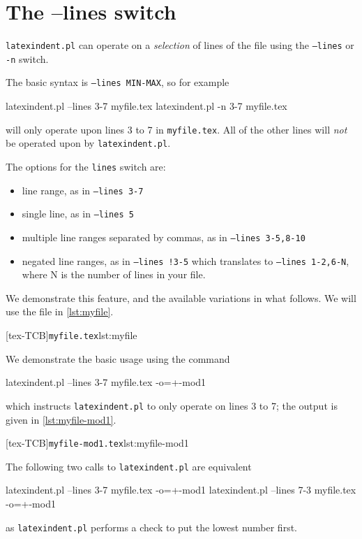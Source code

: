 \documentclass[10pt]{article}
\begin{document}
\section{The --lines switch}\label{sec:line-switch}
 \texttt{latexindent.pl}
  can
 operate on a \emph{selection} of lines of the file using the \texttt{--lines} or
 \texttt{-n} switch.


 The basic syntax is \texttt{--lines MIN-MAX}, so for example

 \begin{commandshell}
latexindent.pl --lines 3-7 myfile.tex
latexindent.pl -n 3-7 myfile.tex
\end{commandshell}

 will only operate upon lines 3 to 7 in \texttt{myfile.tex}. All of the other lines will
 \emph{not} be operated upon by \texttt{latexindent.pl}.

 The options for the \texttt{lines} switch are:
 \begin{itemize}
  \item line range, as in \texttt{--lines 3-7}
  \item single line, as in \texttt{--lines 5}
  \item multiple line ranges separated by commas, as in \texttt{--lines 3-5,8-10}
  \item negated line ranges, as in \texttt{--lines !3-5} which translates to
        \texttt{--lines 1-2,6-N}, where N is the number of lines in your file.
 \end{itemize}

 We demonstrate this feature, and the available variations in what follows. We will use
 the file in \cref{lst:myfile}.

 [tex-TCB]{\texttt{myfile.tex}}{lst:myfile}

 \begin{example}
 We demonstrate the basic usage using the command

 \begin{commandshell}
latexindent.pl --lines 3-7 myfile.tex -o=+-mod1
\end{commandshell}

 which instructs \texttt{latexindent.pl} to only operate on lines 3 to 7; the output is
 given in \cref{lst:myfile-mod1}.

 [tex-TCB]{\texttt{myfile-mod1.tex}}{lst:myfile-mod1}

 The following two calls to \texttt{latexindent.pl} are equivalent

 \begin{commandshell}
latexindent.pl --lines 3-7 myfile.tex -o=+-mod1
latexindent.pl --lines 7-3 myfile.tex -o=+-mod1
\end{commandshell}

 as \texttt{latexindent.pl} performs a check to put the lowest number first.
 \end{example}
\end{document}

